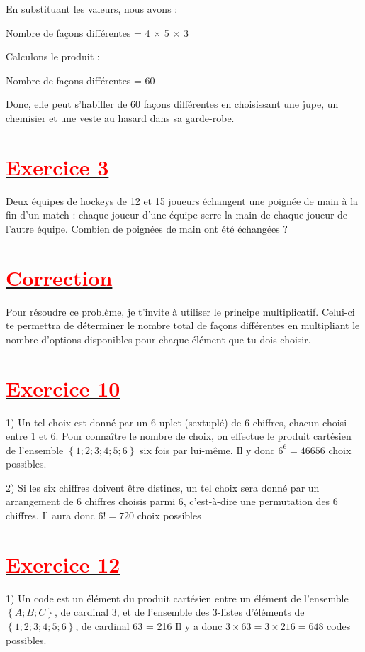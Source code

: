 \documentclass[12pt]{article}
\begin{document}
En substituant les valeurs, nous avons :

Nombre de façons différentes = 4 × 5 × 3

Calculons le produit :

Nombre de façons différentes = 60

Donc, elle peut s'habiller de 60 façons différentes en choisissant une jupe, un chemisier et une veste au hasard dans sa garde-robe.
\section*{\underline{\textbf{\textcolor{red}{Exercice 3}}}}
Deux équipes de hockeys de 12 et 15 joueurs échangent une poignée de main à la fin d’un match : chaque joueur d’une équipe serre la main de chaque joueur de l’autre équipe. Combien de poignées de main ont été échangées ?
\section*{\underline{\textbf{\textcolor{red}{Correction}}}}
Pour résoudre ce problème, je t'invite à utiliser le principe multiplicatif. Celui-ci te permettra de déterminer le nombre total de façons différentes en multipliant le nombre d'options disponibles pour chaque élément que tu dois choisir.
\section*{\underline{\textbf{\textcolor{red}{Exercice 10}}}}
1) Un tel choix est donné par un 6-uplet (sextuplé) de 6 chiffres, chacun choisi entre 1 et 6. Pour connaître le nombre de choix, on effectue le produit cartésien de l’ensemble $\left\lbrace 1; 2;3; 4;5; 6\right\rbrace $ six fois par lui-même. Il y donc $6^{6} = 46656$ choix
possibles.

2) Si les six chiffres doivent être distincs, un tel choix sera donné par un arrangement de 6 chiffres choisis parmi 6, c’est-à-dire une permutation des 6 chiffres. Il aura donc $6 !=720$ choix possibles
\section*{\underline{\textbf{\textcolor{red}{Exercice 12}}}}
1) Un code est un élément du produit cartésien entre un élément de l’ensemble $\left\lbrace A ;B ;C\right\rbrace $, de cardinal 3, et de l’ensemble
des 3-listes d’éléments de $\left\lbrace 1 ;2 ;3 ;4 ;5 ;6\right\rbrace $, de cardinal 63 = 216
Il y a donc $3 \times 63 = 3 \times 216 = 648$ codes possibles.
\end{document}
